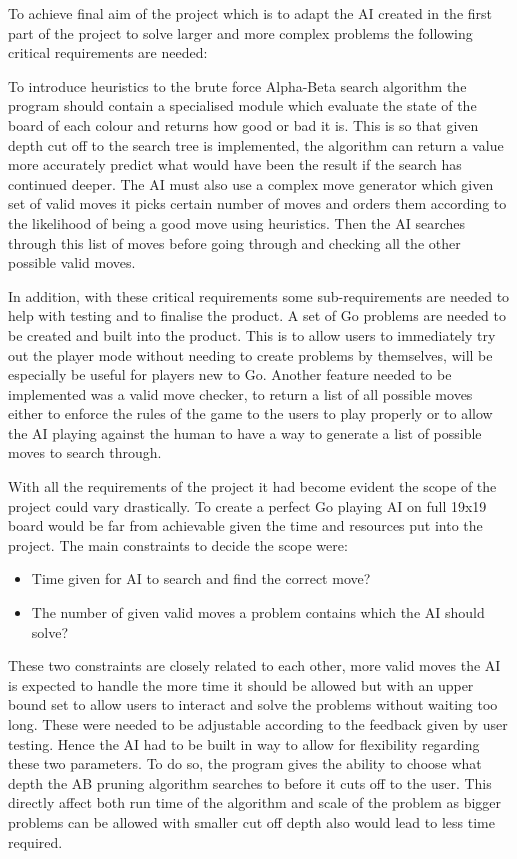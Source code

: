 \documentclass{l4proj}
\begin{document}
To achieve final aim of the project which is to adapt the AI created in the first part of the project to solve larger and more complex problems the following critical requirements are needed:

To introduce heuristics to the brute force Alpha-Beta search algorithm the program should contain a specialised module which evaluate the state of the board of each colour and returns how good or bad it is. This is so that given depth cut off to the search tree is implemented, the algorithm can return a value more accurately predict what would have been the result if the search has continued deeper. The AI must also use a complex move generator which given set of valid moves it picks certain number of moves and orders them according to the likelihood of being a good move using heuristics. Then the AI searches through this list of moves before going through and checking all the other possible valid moves.

In addition, with these critical requirements some sub-requirements are needed to help with testing and to finalise the product. A set of Go problems are needed to be created and built into the product. This is to allow users to immediately try out the player mode without needing to create problems by themselves, will be especially be useful for players new to Go. Another feature needed to be implemented was a valid move checker, to return a list of all possible moves either to enforce the rules of the game to the users to play properly or to allow the AI playing against the human to have a way to generate a list of possible moves to search through.


With all the requirements of the project it had become evident the scope of the project could vary drastically. To create a perfect Go playing AI on full 19x19 board would be far from achievable given the time and resources put into the project. The main constraints to decide the scope were:
\begin{itemize}
	\item Time given for AI to search and find the correct move?
	\item The number of given valid moves a problem contains which the AI should solve?
\end{itemize}
These two constraints are closely related to each other, more valid moves the AI is expected to handle the more time it should be allowed but with an upper bound set to allow users to interact and solve the problems without waiting too long. These were needed to be adjustable according to the feedback given by user testing. Hence the AI had to be built in way to allow for flexibility regarding these two parameters. To do so, the program gives the ability to choose what depth the AB pruning algorithm searches to before it cuts off to the user. This directly affect both run time of the algorithm and scale of the problem as bigger problems can be allowed with smaller cut off depth also would lead to less time required.
\end{document}
